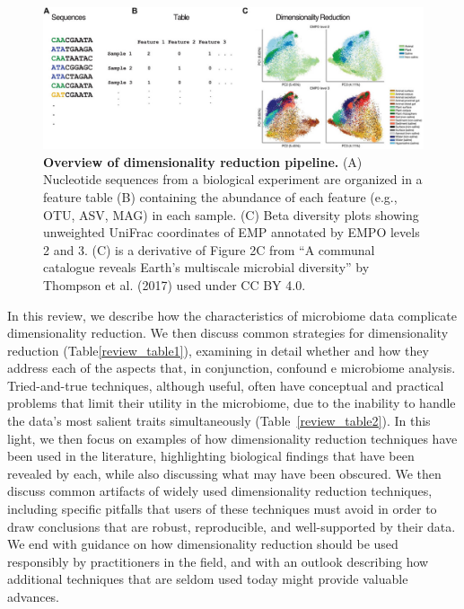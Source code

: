 \begin{figure}[htbp]
\centering
\includegraphics[width=\textwidth]{review-figures/figure01.jpeg}
\caption[Overview of dimensionality reduction pipeline.]{\textbf{Overview of dimensionality reduction pipeline.} (A)  Nucleotide sequences from a biological experiment are organized in a feature table (B) containing the abundance of each feature (e.g., OTU, ASV, MAG) in each sample. (C) Beta diversity plots showing unweighted UniFrac coordinates of EMP annotated by EMPO levels 2 and 3. (C) is a derivative of Figure 2C from “A communal catalogue reveals Earth’s multiscale microbial diversity” by Thompson et al. (2017) used under CC BY 4.0.}
\label{review_fig1}
\end{figure}

In this review, we describe how the characteristics of microbiome data complicate dimensionality reduction. We then discuss common strategies for dimensionality reduction (Table\ref{review_table1}), examining in detail whether and how they address each of the aspects that, in conjunction, confound e microbiome analysis. Tried-and-true techniques, although useful, often have conceptual and practical problems that limit their utility in the microbiome, due to the inability to handle the data's most salient traits simultaneously (Table~\ref{review_table2}). In this light, we then focus on examples of how dimensionality reduction techniques have been used in the literature, highlighting biological findings that have been revealed by each, while also discussing what may have been obscured. We then discuss common artifacts of widely used dimensionality reduction techniques, including specific pitfalls that users of these techniques must avoid in order to draw conclusions that are robust, reproducible, and well-supported by their data. We end with guidance on how dimensionality reduction should be used responsibly by practitioners in the field, and with an outlook describing how additional techniques that are seldom used today might provide valuable advances.

